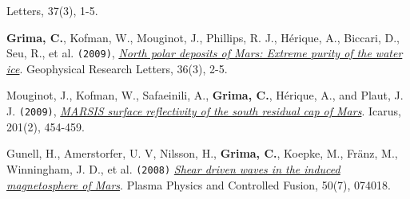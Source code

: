 \begin{etaremune}
  Letters, 37(3), 1-5.
\item
  \textbf{Grima, C.}, Kofman, W., Mouginot, J., Phillips, R. J.,
  Hérique, A., Biccari, D., Seu, R., et al. \texttt{(2009)},
  \href{http://onlinelibrary.wiley.com/doi/10.1029/2008GL036326/abstract}{\emph{North
  polar deposits of Mars: Extreme purity of the water ice}}. Geophysical
  Research Letters, 36(3), 2-5.
\item
  Mouginot, J., Kofman, W., Safaeinili, A., \textbf{Grima, C.}, Hérique,
  A., and Plaut, J. J. \texttt{(2009)},
  \href{http://www.sciencedirect.com/science/article/pii/S0019103509000311}{
  \emph{MARSIS surface reflectivity of the south residual cap of Mars}}.
  Icarus, 201(2), 454-459.
\item
  Gunell, H., Amerstorfer, U. V, Nilsson, H., \textbf{Grima, C.},
  Koepke, M., Fränz, M., Winningham, J. D., et al. \texttt{(2008)}
  \href{http://iopscience.iop.org/0741-3335/50/7/074018}{\emph{Shear
  driven waves in the induced magnetosphere of Mars}}. Plasma Physics
  and Controlled Fusion, 50(7), 074018.
\end{etaremune}
